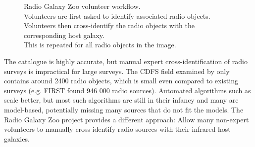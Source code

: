 \begin{figure}
\begin{subfigure}[t]{0.3\textwidth}
            \end{subfigure}
            \caption{Radio Galaxy Zoo volunteer workflow.\\
                \protect\makebox[1.5cm][r]{\ref{fig:rgz-interface-a}}
                    Volunteers are first asked to identify associated radio
                    objects.\\
                \protect\makebox[1.5cm][r]{\ref{fig:rgz-interface-b}}
                    Volunteers then cross-identify the radio objects with the
                    corresponding host galaxy.\\
                \protect\makebox[1.5cm][r]{\ref{fig:rgz-interface-c}}
                    This is repeated for all radio objects in the image.}
            \label{fig:rgz-interface}
        \end{figure}


    The \citeauthor{norris06} catalogue is highly accurate, but manual expert
    cross-identification of radio surveys is impractical for large surveys. The
    CDFS field examined by \citeauthor{norris06} only contains around 2400 radio
    objects, which is small even compared to existing surveys (e.g. FIRST
    \citep{becker95} found 946 000 radio sources). Automated algorithms such as
    \citeauthor{fan15} scale better, but most such algorithms are still in their
    infancy \citeauthor{norris16} and many are model-based, potentially missing
    many sources that do not fit the models. The Radio Galaxy Zoo project
    \citep{banfield15} provides a different approach: Allow many non-expert
    volunteers to manually cross-identify radio sources with their infrared host
    galaxies.

